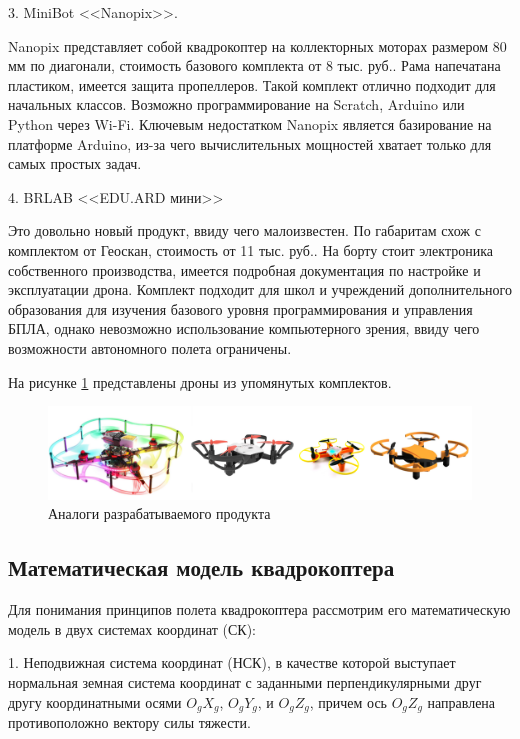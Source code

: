 3. MiniBot <<Nanopix>>.

Nanopix представляет собой квадрокоптер на коллекторных моторах размером 80 мм по диагонали, стоимость базового комплекта от 8 тыс. руб.. Рама напечатана пластиком, имеется защита пропеллеров. Такой комплект отлично подходит для начальных классов. Возможно программирование на Scratch, Arduino или Python через Wi-Fi. Ключевым недостатком Nanopix является базирование на платформе Arduino, из-за чего вычислительных мощностей хватает только для самых простых задач.

4. BRLAB <<EDU.ARD мини>>

Это довольно новый продукт, ввиду чего малоизвестен. По габаритам схож с комплектом от Геоскан, стоимость от 11 тыс. руб.. На борту стоит электроника собственного производства, имеется подробная документация по настройке и эксплуатации дрона. Комплект подходит для школ и учреждений дополнительного образования для изучения базового уровня программирования и управления БПЛА, однако невозможно использование компьютерного зрения, ввиду чего возможности автономного полета ограничены.

На рисунке \ref{fig:ris0} представлены дроны из упомянутых комплектов.
\begin{figure}[H]
	\centering
	\includegraphics[width=0.8\linewidth]{./pics/analogi}
	\caption{Аналоги разрабатываемого продукта
	}
	\label{fig:ris0}
\end{figure}

\subsection{Математическая модель квадрокоптера}

Для понимания принципов полета квадрокоптера рассмотрим его математическую модель в двух системах координат (СК):

1. Неподвижная система координат (НСК), в качестве которой выступает нормальная земная система координат с заданными перпендикулярными друг другу координатными осями \(O_{g}X_{g}\), \(O_{g}Y_{g}\), и \(O_{g}Z_{g}\), причем ось \(O_{g}Z_{g}\) направлена противоположно вектору силы тяжести.

